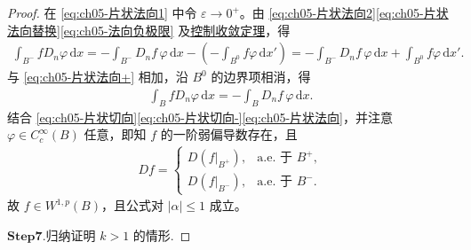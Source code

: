 \documentclass[../../main.tex]{subfiles}
\begin{document}
\begin{proof}
在 \eqref{eq:ch05-片状法向1} 中令 $\varepsilon\to0^{+}$。由 \eqref{eq:ch05-片状法向2}\eqref{eq:ch05-片状法向替换}\eqref{eq:ch05-法向负极限} 及\hyperref[Real Analysis-theorem:控制收敛定理]{控制收敛定理}，得
\begin{align}
\int_{B^{-}}fD_n\varphi\,\mathrm{d}x
=-\int_{B^{-}}D_nf\,\varphi\,\mathrm{d}x
-\left(-\int_{B^{0}}f\varphi\,\mathrm{d}x'\right)
=-\int_{B^{-}}D_nf\,\varphi\,\mathrm{d}x
+\int_{B^{0}}f\varphi\,\mathrm{d}x'.
\label{eq:ch05-片状法向-}
\end{align}
与 \eqref{eq:ch05-片状法向+} 相加，沿 $B^{0}$ 的边界项相消，得
\begin{align}
\int_{B}fD_n\varphi\,\mathrm{d}x
=-\int_{B}D_nf\,\varphi\,\mathrm{d}x.
\label{eq:ch05-片状法向}
\end{align}
结合 \eqref{eq:ch05-片状切向}\eqref{eq:ch05-片状切向-}\eqref{eq:ch05-片状法向}，并注意 $\varphi\in C_{c}^{\infty}(B)$ 任意，即知 $f$ 的一阶弱偏导数存在，且
\begin{align*}
Df=
\begin{cases}
D(f|_{B^{+}}), & \text{a.e. 于 }B^{+},\\
D(f|_{B^{-}}), & \text{a.e. 于 }B^{-}.
\end{cases}
\end{align*}
故 $f\in W^{1,p}(B)$，且公式对 $|\alpha|\leqslant1$ 成立。

\noindent$\mathbf{Step}\bm{7}$.{\heiti 归纳证明 $k>1$ 的情形.}


\end{proof}
\end{document}
